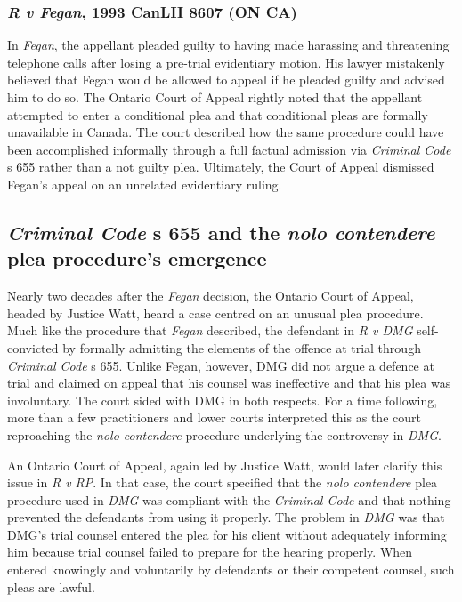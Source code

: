 \subsubsection{\textit{R v Fegan}, 1993 CanLII 8607 (ON CA)}

In \textit{Fegan}, the appellant pleaded guilty to having made harassing and threatening telephone calls after losing a pre-trial evidentiary motion. His lawyer mistakenly believed that Fegan would be allowed to appeal if he pleaded guilty and advised him to do so. The Ontario Court of Appeal rightly noted that the appellant attempted to enter a conditional plea and that conditional pleas are formally unavailable in Canada. The court described how the same procedure could have been accomplished informally through a full factual admission via \textit{Criminal Code} s 655 rather than a not guilty plea. Ultimately, the Court of Appeal dismissed Fegan's appeal on an unrelated evidentiary ruling.

\subsection{\textit{Criminal Code} s 655 and the \textit{nolo contendere} plea procedure's emergence}

Nearly two decades after the \textit{Fegan} decision, the Ontario Court of Appeal, headed by Justice Watt, heard a case centred on an unusual plea procedure. Much like the procedure that \textit{Fegan} described, the defendant in \textit{R v DMG} self-convicted by formally admitting the elements of the offence at trial through \textit{Criminal Code} s 655. Unlike Fegan, however, DMG did not argue a defence at trial and claimed on appeal that his counsel was ineffective and that his plea was involuntary. The court sided with DMG in both respects. For a time following, more than a few practitioners and lower courts interpreted this as the court reproaching the \textit{nolo contendere} procedure underlying the controversy in \textit{DMG}.

An Ontario Court of Appeal, again led by Justice Watt, would later clarify this issue in \textit{R v RP}. In that case, the court specified that the \textit{nolo contendere} plea procedure used in \textit{DMG} was compliant with the \textit{Criminal Code} and that nothing prevented the defendants from using it properly. The problem in \textit{DMG} was that DMG's trial counsel entered the plea for his client without adequately informing him because trial counsel failed to prepare for the hearing properly. When entered knowingly and voluntarily by defendants or their competent counsel, such pleas are lawful.

